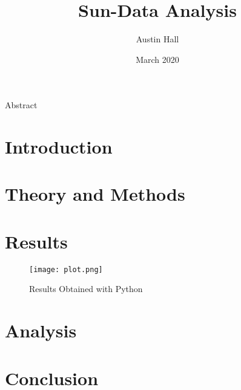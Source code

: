 \documentclass{article}
\author{Austin Hall}
\date{March 2020}
\title{\huge Sun-Data Analysis}
\begin{document}
\maketitle
\begin{center}
{\LARGE Abstract}\\
\end{center}

\newpage
\section{Introduction}


\newpage
\section{Theory and Methods}


\newpage
\section{Results}
\begin{figure}[h!]
\centering
\texttt{[image: plot.png]}
\caption{Results Obtained with Python}
\label{fig:SunData}
\end{figure}

\newpage
\section{Analysis}


\newpage
\section{Conclusion}
\newpage

\end{document}
